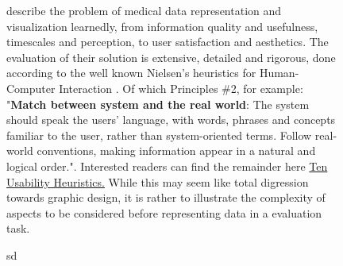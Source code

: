 \begin{figure}
    \footnotesize
\noindent
{}
\begin{tcolorbox}[sidebyside,arc=0.5mm, 
    colback=MidnightBlue!10!white, 
    coltext=MidnightBlue!90!black,  
    colframe=MidnightBlue!90!black,
    colbacktitle=MidnightBlue!80,
    leftrule=0mm,
    rightrule=0mm, 
    toprule=0mm, 
    bottomrule=0mm,
    box align=top,
    title={\begin{panel}Representation and visualisation \label{pan:visualisation}\end{panel}}]

\citeauthor{Ledesma2016-hn} describe the problem of medical data representation and visualization learnedly, from information quality and usefulness, timescales and perception, to user satisfaction and aesthetics. The evaluation of their solution is extensive, detailed and rigorous, done according to the well known Nielsen's heuristics for Human-Computer Interaction \cite{nielsend}. Of which Principles \#2, for example: "\textbf{Match between system and the real world}: The system should speak the users' language, with words, phrases and concepts familiar to the user, rather than system-oriented terms. Follow real-world conventions, making information appear in a natural and logical order.". Interested readers can find the remainder here \href{https://www.nngroup.com/articles/ten-usability-heuristics/}{Ten Usability Heuristics.} While this may seem like total digression towards graphic design, it is rather to illustrate the complexity of aspects to be considered before representing data in a evaluation task.

\tcblower
sd



\end{tcolorbox}
\normalsize
\end{figure}